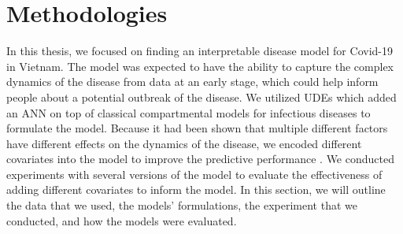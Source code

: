 \chapter{Methodologies}
\label{chap:methodologies}

In this thesis, we focused on finding an interpretable disease model for Covid-19 in Vietnam.
The model was expected to have the ability to capture the complex dynamics of the disease from data at an early stage, which could help inform people about a potential outbreak of the disease.
We utilized \glspl{UDE} which added an \gls{ANN} on top of classical compartmental models for infectious diseases to formulate the model.
Because it had been shown that multiple different factors have different effects on the dynamics of the disease, we encoded different covariates into the model to improve the predictive performance \cite{ihmecovid-19forecastingteamModelingCOVID19Scenarios2021,arikInterpretableSequenceLearning}.
We conducted experiments with several versions of the model to evaluate the effectiveness of adding different covariates to inform the model.
In this section, we will outline the data that we used, the models' formulations, the experiment that we conducted, and how the models were evaluated.












